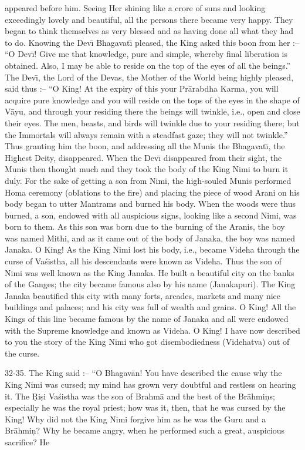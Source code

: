appeared before him. Seeing Her shining like a crore of suns and looking exceedingly lovely and beautiful, all the persons there became very happy. They began to think themselves as very blessed and as having done all what they had to do. Knowing the Dev\={\i} Bhagavat\={\i} pleased, the King asked this boon from her :-- ``O Dev\={\i}! Give me that knowledge, pure and simple, whereby final liberation is obtained. Also, I may be able to reside on the top of the eyes of all the beings.'' The Dev\={\i}, the Lord of the Devas, the Mother of the World being highly pleased, said thus :-- ``O King! At the expiry of this your Pr\=arabdha Karma, you will acquire pure knowledge and you will reside on the tops of the eyes in the shape of V\=ayu, and through your residing there the beings will twinkle, i.e., open and close their eyes. The men, beasts, and birds will twinkle due to your residing there; but the Immortals will always remain with a steadfast gaze; they will not twinkle.'' Thus granting him the boon, and addressing all the Munis the Bhagavat\={\i}, the Highest Deity, disappeared. When the Dev\={\i} disappeared from their sight, the Munis then thought much and they took the body of the King Nimi to burn it duly. For the sake of getting a son from Nimi, the high-souled Munis performed Homa ceremony (oblations to the fire) and placing the piece of wood Arani on his body began to utter Mantrams and burned his body. When the woods were thus burned, a son, endowed with all auspicious signs, looking like a second Nimi, was born to them. As this son was born due to the burning of the Aranis, the boy was named Mithi, and as it came out of the body of Janaka, the boy was named Janaka. O King! As the King Nimi lost his body, i.e., became Videha through the curse of Va\'sistha, all his descendants were known as Videha. Thus the son of Nimi was well known as the King Janaka. He built a beautiful city on the banks of the Ganges; the city became famous also by his name (Janakapuri). The King Janaka beautified this city with many forts, arcades, markets and many nice buildings and palaces; and his city was full of wealth and grains. O King! All the Kings of this line became famous by the name of Janaka and all were endowed with the Supreme knowledge and known as Videha. O King! I have now described to you the story of the King Nimi who got disembodiedness (Videhatva) out of the curse.

32-35. The King said :-- ``O Bhagav\=an! You have described the cause why the King Nimi was cursed; my mind has grown very doubtful and restless on hearing it. The \d{R}i\d{s}i Va\'sistha was the son of Brahm\=a and the best of the Br\=ahmi\d{n}s; especially he was the royal priest; how was it, then, that he was cursed by the King! Why did not the King Nimi forgive him as he was the Guru and a Br\=ahmi\d{n}? Why he became angry, when he performed such a great, auspicious sacrifice? He


